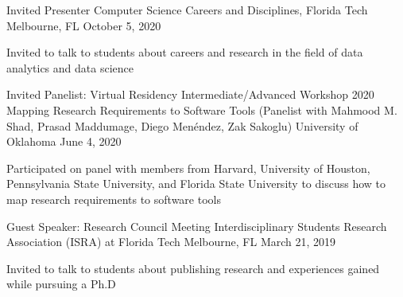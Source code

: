 


\begin{cventries}



\cventry
{Invited Presenter }
{Computer Science Careers and Disciplines, Florida Tech}
{Melbourne, FL}
{October 5, 2020}
{
 \begin{cvitems}
 \item Invited to talk to students about careers and research in the field of data analytics and data science
  \end{cvitems}
}

\cventry
{Invited Panelist: Virtual Residency Intermediate/Advanced Workshop 2020}
{Mapping Research Requirements to Software Tools (Panelist with Mahmood M. Shad, Prasad Maddumage, Diego Menéndez, Zak Sakoglu)}
{University of Oklahoma}
{June 4, 2020}
{
 \begin{cvitems}
 \item Participated on panel with members from Harvard, University of Houston, Pennsylvania State University, and Florida State University to discuss how to map research  requirements to software tools
  \end{cvitems}
}

\cventry
{Guest Speaker: Research Council Meeting }
{Interdisciplinary Students Research Association (ISRA) at Florida Tech}
{Melbourne, FL}
{March 21, 2019}
{
 \begin{cvitems}
 \item Invited to talk to students about publishing research and experiences gained while pursuing a Ph.D
  \end{cvitems}
}




\end{cventries}